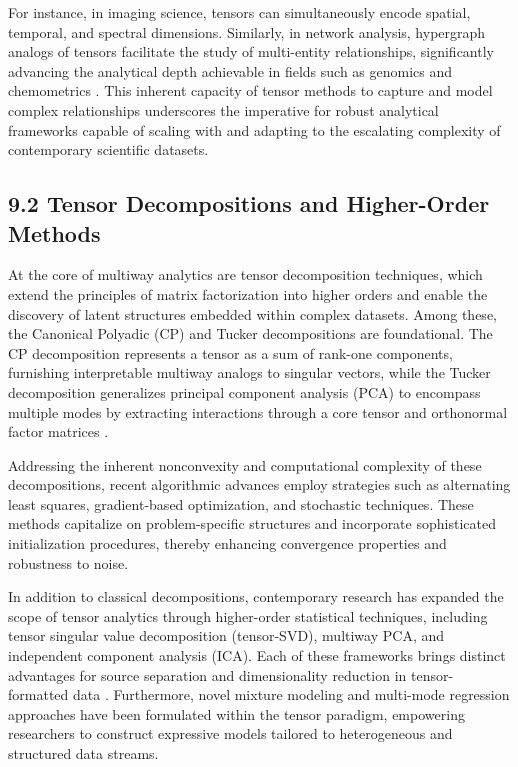 \documentclass[11pt]{article}
\begin{document}
For instance, in imaging science, tensors can simultaneously encode spatial, temporal, and spectral dimensions. Similarly, in network analysis, hypergraph analogs of tensors facilitate the study of multi-entity relationships, significantly advancing the analytical depth achievable in fields such as genomics and chemometrics \cite{ref104}. This inherent capacity of tensor methods to capture and model complex relationships underscores the imperative for robust analytical frameworks capable of scaling with and adapting to the escalating complexity of contemporary scientific datasets.

\subsection{9.2 Tensor Decompositions and Higher-Order Methods}

At the core of multiway analytics are tensor decomposition techniques, which extend the principles of matrix factorization into higher orders and enable the discovery of latent structures embedded within complex datasets. Among these, the Canonical Polyadic (CP) and Tucker decompositions are foundational. The CP decomposition represents a tensor as a sum of rank-one components, furnishing interpretable multiway analogs to singular vectors, while the Tucker decomposition generalizes principal component analysis (PCA) to encompass multiple modes by extracting interactions through a core tensor and orthonormal factor matrices \cite{ref104}. 

Addressing the inherent nonconvexity and computational complexity of these decompositions, recent algorithmic advances employ strategies such as alternating least squares, gradient-based optimization, and stochastic techniques. These methods capitalize on problem-specific structures and incorporate sophisticated initialization procedures, thereby enhancing convergence properties and robustness to noise.

In addition to classical decompositions, contemporary research has expanded the scope of tensor analytics through higher-order statistical techniques, including tensor singular value decomposition (tensor-SVD), multiway PCA, and independent component analysis (ICA). Each of these frameworks brings distinct advantages for source separation and dimensionality reduction in tensor-formatted data \cite{ref104}. Furthermore, novel mixture modeling and multi-mode regression approaches have been formulated within the tensor paradigm, empowering researchers to construct expressive models tailored to heterogeneous and structured data streams.
\end{document}
